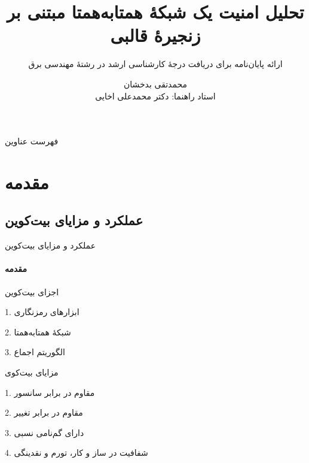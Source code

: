 \documentclass{beamer}
\begin{document}
\title{%
تحلیل امنیت یک شبکهٔ همتا‌به‌همتا مبتنی بر زنجیرهٔ قالبی
}
\subtitle{ارائه پایان‌نامه برای دریافت درجهٔ کارشناسی ارشد در رشتهٔ مهندسی برق}

\author[محمدتقی بدخشان]{
	محمدتقی بدخشان
\\[5mm]{ 
	استاد راهنما: دکتر محمدعلی اخایی}}



\begin{frame}[plain]
\maketitle
\end{frame}

\begin{frame}[plain]{فهرست عناوین}
\tableofcontents
\end{frame}


\section{مقدمه\hfill}
\subsection{عملکرد و مزایای بیت‌کوین}
\begin{frame}{عملکرد و مزایای بیت‌کوین}
	\framesubtitle{مقدمه}
	\begin{block}{اجزای بیت‌کوین}
		
		1. ابزارهای رمزنگاری
		
		2. شبکهٔ همتا‌به‌همتا
		
		3. الگوریتم اجماع
		
	\end{block}
	
	
	
	\begin{block}{مزایای بیت‌کوی}
		
		1. مقاوم در برابر سانسور
		
		2. مقاوم در برابر تغییر
		
		3. دارای گم‌نامی نسبی
		
		4. شفافیت در ساز و کار، تورم و نقدینگی
		
	\end{block}
	
\end{frame}
\end{document}
